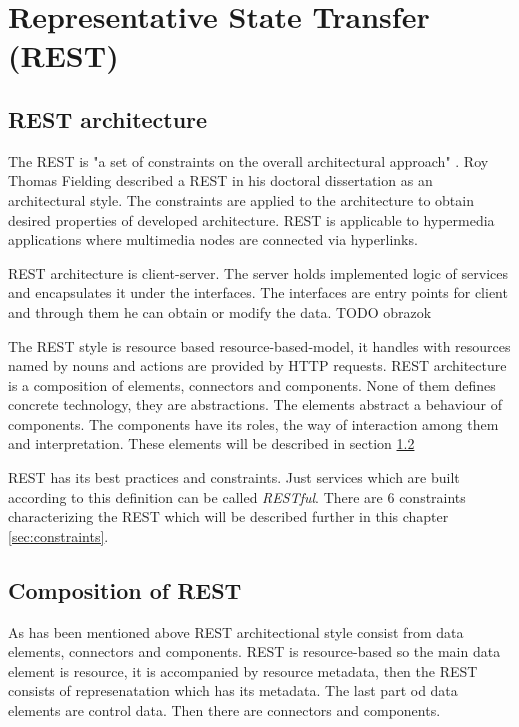 \chapter{Representative State Transfer (REST)}
\label{chap:rest}


\section{REST architecture}
\label{sec:rest-architecture}

The REST is "a set of constraints on the overall architectural approach" \cite{agile-architecture}. Roy Thomas Fielding described a REST in his doctoral dissertation as an architectural style. The constraints are applied to the architecture to obtain desired properties of developed architecture. REST is applicable to \gls{hypermedia}  applications where multimedia nodes are connected via hyperlinks.

REST architecture is client-server. The server holds implemented logic of services and encapsulates it under the interfaces. The interfaces are entry points for client and through them he can obtain or modify the data. TODO obrazok

The REST style is resource based \gls{resource-based-model}, it handles with resources named by nouns and actions are provided by HTTP requests. 
REST architecture is a composition of elements, connectors and components. None of them defines concrete technology, they are abstractions. The elements abstract a behaviour of components. The components have its roles, the way of interaction among them and interpretation. These elements will be described in section \ref{sec:rest-composition}

REST has its best practices and constraints. Just services which are built according to this definition can be called \emph{RESTful}. There are 6 constraints characterizing the REST which will be described further in this chapter \ref{sec:constraints}.

\section{Composition of REST}
\label{sec:rest-composition}
As has been mentioned above REST architectional style consist from data elements, connectors and components. REST is resource-based so the main data element is resource, it is accompanied by resource metadata, then the REST consists of represenatation which has its metadata. The last part od data elements are control data. Then there are connectors and components.


